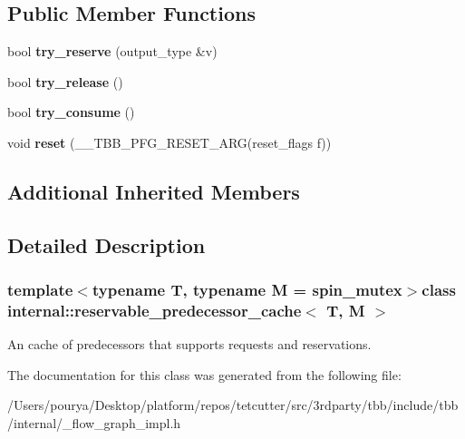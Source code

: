 \subsection*{Public Member Functions}
\begin{DoxyCompactItemize}
\item 
\hypertarget{classinternal_1_1reservable__predecessor__cache_a4fc7dee657d594fca77bc9290d034df6}{}bool {\bfseries try\+\_\+reserve} (output\+\_\+type \&v)\label{classinternal_1_1reservable__predecessor__cache_a4fc7dee657d594fca77bc9290d034df6}

\item 
\hypertarget{classinternal_1_1reservable__predecessor__cache_a59de0d356d80e248780f6d6b4f32453e}{}bool {\bfseries try\+\_\+release} ()\label{classinternal_1_1reservable__predecessor__cache_a59de0d356d80e248780f6d6b4f32453e}

\item 
\hypertarget{classinternal_1_1reservable__predecessor__cache_a1abdd94e04ec88299a5f21e6a75e400d}{}bool {\bfseries try\+\_\+consume} ()\label{classinternal_1_1reservable__predecessor__cache_a1abdd94e04ec88299a5f21e6a75e400d}

\item 
\hypertarget{classinternal_1_1reservable__predecessor__cache_a684ea8c41e16cc946ec8cabafbe32400}{}void {\bfseries reset} (\+\_\+\+\_\+\+T\+B\+B\+\_\+\+P\+F\+G\+\_\+\+R\+E\+S\+E\+T\+\_\+\+A\+R\+G(reset\+\_\+flags f))\label{classinternal_1_1reservable__predecessor__cache_a684ea8c41e16cc946ec8cabafbe32400}

\end{DoxyCompactItemize}
\subsection*{Additional Inherited Members}


\subsection{Detailed Description}
\subsubsection*{template$<$typename T, typename M = spin\+\_\+mutex$>$class internal\+::reservable\+\_\+predecessor\+\_\+cache$<$ T, M $>$}

An cache of predecessors that supports requests and reservations. 

The documentation for this class was generated from the following file\+:\begin{DoxyCompactItemize}
\item 
/\+Users/pourya/\+Desktop/platform/repos/tetcutter/src/3rdparty/tbb/include/tbb/internal/\+\_\+flow\+\_\+graph\+\_\+impl.\+h\end{DoxyCompactItemize}
